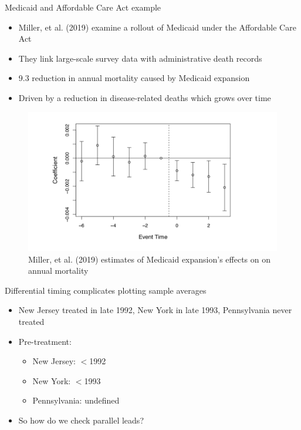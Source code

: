 \documentclass{beamer}
\begin{document}
\begin{frame}{Medicaid and Affordable Care Act example}

\begin{itemize}
\item Miller, et al. (2019) examine a rollout of Medicaid under the Affordable Care Act
\item They link large-scale survey data with administrative death records
\item 9.3 reduction in annual mortality caused by Medicaid expansion
\item Driven by a reduction in disease-related deaths which grows over time
\end{itemize}

\end{frame}





\begin{frame}[plain]

	\begin{figure}
	\includegraphics[scale=0.3]{./lecture_includes/Miller_Medicaid4.png}
	\caption{Miller, et al. (2019) estimates of Medicaid expansion's effects on on annual mortality}
	\end{figure}

\end{frame}


\begin{frame}{Differential timing complicates plotting sample averages}

\begin{itemize}
\item New Jersey treated in late 1992, New York in late 1993, Pennsylvania never treated
\item Pre-treatment:
	\begin{itemize}
	\item New Jersey: $<$1992
	\item New York: $<$1993
	\item Pennsylvania: undefined
	\end{itemize}
\item So how do we check parallel leads?

\end{itemize}

\end{frame}
\end{document}
